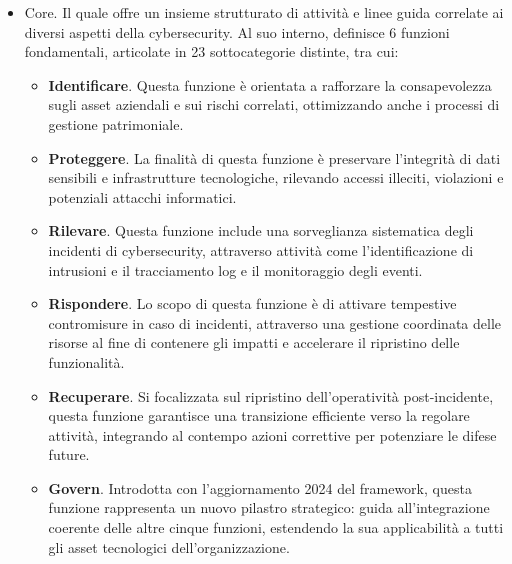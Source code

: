         \begin{itemize}
            \item Core. Il quale offre un insieme strutturato di attività e linee guida correlate ai diversi aspetti della cybersecurity. Al suo interno, definisce 6 funzioni fondamentali, articolate in 23 sottocategorie distinte, tra cui:
                \begin{itemize}
                    \item \textbf{Identificare}. Questa funzione è orientata a rafforzare la consapevolezza sugli asset aziendali e sui rischi correlati, ottimizzando anche i processi di gestione patrimoniale.
                    \item \textbf{Proteggere}. La finalità di questa funzione è preservare l'integrità di dati sensibili e infrastrutture tecnologiche, rilevando accessi illeciti, violazioni e potenziali attacchi informatici.
                    \item \textbf{Rilevare}. Questa funzione include una sorveglianza sistematica degli incidenti di cybersecurity, attraverso attività come l'identificazione di intrusioni e il tracciamento log e il monitoraggio degli eventi.
                    \item \textbf{Rispondere}. Lo scopo di questa funzione è di attivare tempestive contromisure in caso di incidenti, attraverso una gestione coordinata delle risorse al fine di contenere gli impatti e accelerare il ripristino delle funzionalità.
                    \item \textbf{Recuperare}. Si focalizzata sul ripristino dell'operatività post-incidente, questa funzione garantisce una transizione efficiente verso la regolare attività, integrando al contempo azioni correttive per potenziare le difese future.
                    \item \textbf{Govern}. Introdotta con l'aggiornamento 2024 del framework, questa funzione rappresenta un nuovo pilastro strategico: guida all'integrazione coerente delle altre cinque funzioni, estendendo la sua applicabilità a tutti gli asset tecnologici dell'organizzazione.


\end{itemize}
\end{itemize}
